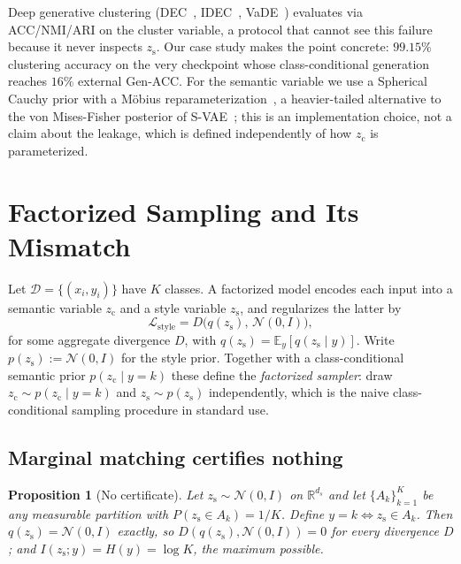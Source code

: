 \documentclass[letterpaper]{article}
\newtheorem{proposition}{Proposition}
\newcommand{\zc}{z_{\mathrm{c}}}
\newcommand{\zs}{z_{\mathrm{s}}}
\newcommand{\R}{\mathbb{R}}
\begin{document}
Deep generative
clustering (DEC~\citep{xie2015unsupervised},
IDEC~\citep{guo2017improved}, VaDE~\citep{jiang2016variational}) evaluates
via ACC/NMI/ARI on the cluster variable, a protocol that cannot see this
failure because it never inspects $\zs$. Our case study makes the point
concrete: $99.15\%$ clustering accuracy on the very checkpoint whose
class-conditional generation reaches $16\%$ external Gen-ACC. For the semantic
variable we use a Spherical Cauchy prior with a M\"obius
reparameterization~\citep{sablica2025hyperspherical}, a heavier-tailed
alternative to the von Mises-Fisher posterior of
S-VAE~\citep{davidson2018hyperspherical}; this is an implementation choice,
not a claim about the leakage, which is defined independently of how $\zc$ is
parameterized.

\section{Factorized Sampling and Its Mismatch}
\label{sec:theory}

Let $\mathcal D=\{(x_i,y_i)\}$ have $K$ classes. A factorized model encodes
each input into a semantic variable $\zc$ and a style variable $\zs$, and
regularizes the latter by
\begin{equation}
\mathcal L_{\mathrm{style}} = D\bigl(q(\zs),\,\mathcal N(0,I)\bigr),
\label{eq:style}
\end{equation}
for some aggregate divergence $D$, with $q(\zs)=\mathbb E_y[q(\zs\mid y)]$.
Write $p(\zs):=\mathcal N(0,I)$ for the style prior. Together with a
class-conditional semantic prior $p(\zc\mid y{=}k)$ these define the
\emph{factorized sampler}: draw $\zc\sim p(\zc\mid y{=}k)$ and $\zs\sim
p(\zs)$ independently, which is the naive class-conditional sampling
procedure in standard use.

\subsection{Marginal matching certifies nothing}

\begin{proposition}[No certificate]
\label{prop:nocert}
Let $\zs\sim\mathcal N(0,I)$ on $\R^{d_s}$ and let $\{A_k\}_{k=1}^K$ be any
measurable partition with $P(\zs\in A_k)=1/K$. Define $y=k \iff \zs\in A_k$.
Then $q(\zs)=\mathcal N(0,I)$ exactly, so $D(q(\zs),\mathcal N(0,I))=0$ for
\emph{every} divergence $D$; and $I(\zs;y)=H(y)=\log K$, the maximum
possible.
\end{proposition}
\end{document}
